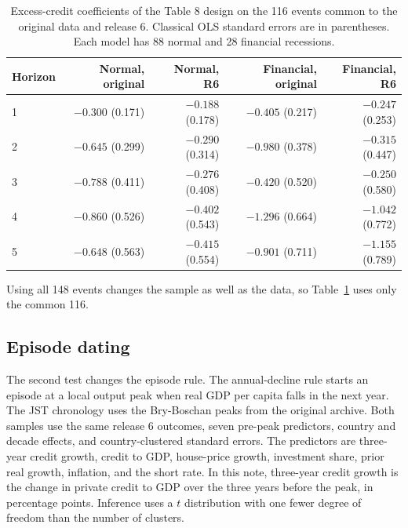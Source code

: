 \documentclass[11pt]{article}
\begin{document}
\begin{table}[htbp]
\centering
\small
\caption{Excess-credit coefficients of the Table 8 design on the 116 events common to the
original data and release 6. Classical OLS standard errors are in parentheses. Each model
has 88 normal and 28 financial recessions.}
\label{tab:vintage}
\begin{tabular}{lrrrr}
\toprule
Horizon & Normal, original & Normal, R6 & Financial, original & Financial, R6 \\
\midrule
1 & $-0.300$ (0.171) & $-0.188$ (0.178) & $-0.405$ (0.217) & $-0.247$ (0.253) \\
2 & $-0.645$ (0.299) & $-0.290$ (0.314) & $-0.980$ (0.378) & $-0.315$ (0.447) \\
3 & $-0.788$ (0.411) & $-0.276$ (0.408) & $-0.420$ (0.520) & $-0.250$ (0.580) \\
4 & $-0.860$ (0.526) & $-0.402$ (0.543) & $-1.296$ (0.664) & $-1.042$ (0.772) \\
5 & $-0.648$ (0.563) & $-0.415$ (0.554) & $-0.901$ (0.711) & $-1.155$ (0.789) \\
\bottomrule
\end{tabular}
\end{table}

Using all 148 events changes the sample as well as the data, so Table~\ref{tab:vintage}
uses only the common 116.

\subsection{Episode dating}
The second test changes the episode rule. The annual-decline rule starts an episode at a
local output peak when real GDP per capita falls in the next year. The JST chronology uses
the Bry-Boschan peaks from the original archive. Both samples use the same release 6
outcomes, seven pre-peak predictors, country and decade effects, and country-clustered
standard errors. The predictors are three-year credit growth, credit to GDP, house-price
growth, investment share, prior real growth, inflation, and the short rate. In this note,
three-year credit growth is the change in private credit to GDP over the three years before
the peak, in percentage points. Inference uses a
$t$ distribution with one fewer degree of freedom than the number of clusters.
\end{document}
